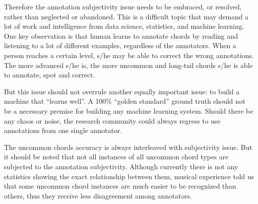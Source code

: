 Therefore the annotation subjectivity issue needs to be embraced, or resolved, rather than neglected or abandoned. This is a difficult topic that may demand a lot of work and intelligence from data science, statistics, and machine learning. One key observation is that human learns to annotate chords by reading and listening to a lot of different examples, regardless of the annotators. When a person reaches a certain level, s/he may be able to correct the wrong annotations. The more advanced s/he is, the more uncommon and long-tail chords s/he is able to annotate, spot and correct.

But this issue should not overrule another equally important issue: to build a machine that ``learns well''. A 100\% ``golden standard'' ground truth should not be a necessary premise for building any machine learning system. Should there be any chaos or noise, the research community could always regress to use annotations from one single annotator.

The uncommon chords accuracy is always interleaved with subjectivity issue. But it should be noted that not all instances of all uncommon chord types are subjected to the annotation subjectivity. Although currently there is not any statistics showing the exact relationship between them, musical experience told us that some uncommon chord instances are much easier to be recognized than others, thus they receive less disagreement among annotators.




